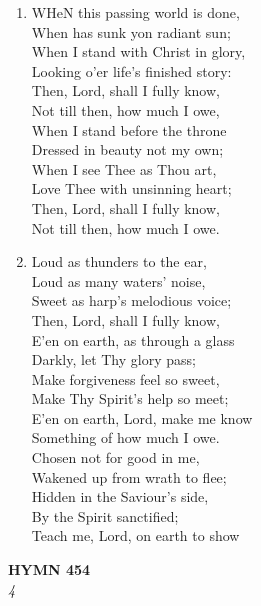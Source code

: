 \documentclass[11pt,a4paper]{article}
\begin{document}
\begin{enumerate}
    \item WHeN this passing world is done, \\
        When has sunk yon radiant sun; \\
        When I stand with Christ in glory, \\
        Looking o'er life's finished story: \\
        Then, Lord, shall I fully know, \\
        Not till then, how much I owe, \\
        When I stand before the throne \\
        Dressed in beauty not my own; \\
        When I see Thee as Thou art, \\
        Love Thee with unsinning heart; \\
        Then, Lord, shall I fully know, \\
        Not till then, how much I owe.

    \item Loud as thunders to the ear, \\
        Loud as many waters' noise, \\
        Sweet as harp's melodious voice; \\
        Then, Lord, shall I fully know, \\
        E'en on earth, as through a glass \\
        Darkly, let Thy glory pass; \\
        Make forgiveness feel so sweet, \\
        Make Thy Spirit's help so meet; \\
        E'en on earth, Lord, make me know \\
        Something of how much I owe. \\
        Chosen not for good in me, \\
        Wakened up from wrath to flee; \\
        Hidden in the Saviour's side, \\
        By the Spirit sanctified; \\
        Teach me, Lord, on earth to show

\end{enumerate}

\newpage
\begin{center}
    {\Large \textbf{HYMN 454}}
    \\
    \textit{4}
\end{center}
\vspace{1em}
\end{document}
